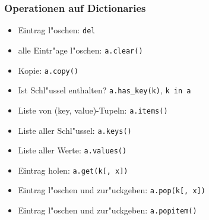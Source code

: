 \begin{frame}[fragile]
\frametitle{Operationen auf Dictionaries}
\begin{itemize}
\item Eintrag l"oschen: \lstinline{del}
\item alle Eintr"age l"oschen: \lstinline{a.clear()}
\item Kopie: \lstinline{a.copy()}
\item Ist Schl"ussel enthalten? \lstinline{a.has_key(k)}, \lstinline{k in a}
\item Liste von (key, value)-Tupeln: \lstinline{a.items()}
\item Liste aller Schl"ussel: \lstinline{a.keys()}
\item Liste aller Werte: \lstinline{a.values()}
\item Eintrag holen: \lstinline{a.get(k[, x])}
\item Eintrag l"oschen und zur"uckgeben: \lstinline{a.pop(k[, x])}
\item Eintrag l"oschen und zur"uckgeben:  \lstinline{a.popitem()}
\end{itemize}
\end{frame}



